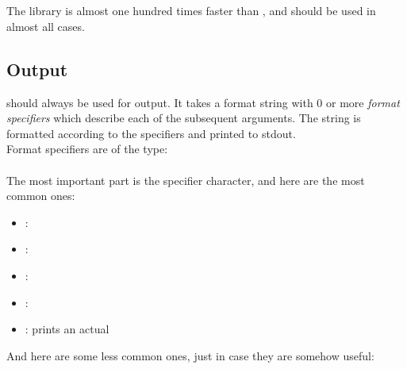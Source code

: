 \documentclass[../main]{subfiles}
\begin{document}
\section{}

The  library is almost one hundred times faster than , and should be used in almost all cases.

\subsection{Output}

 should always be used for output. It takes a format string with 0 or more \textit{format specifiers} which describe each of the subsequent arguments. The string is formatted according to the specifiers and printed to stdout.\\

Format specifiers are of the type:\\
\\

The most important part is the specifier character, and here are the most common ones:

\begin{itemize}
	\item {}: 
	\item {}: 
	\item {}: 
	\item {}: 
	\item \code{\\\%}: prints an actual \code{\%}
\end{itemize}

And here are some less common ones, just in case they are somehow useful:
\end{document}
